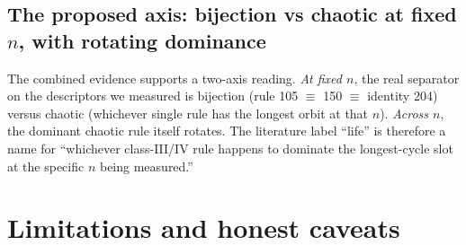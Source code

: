 \documentclass[11pt,a4paper]{article}
\begin{document}
\subsection{The proposed axis: bijection vs chaotic at fixed $n$, with rotating dominance}
The combined evidence supports a two-axis reading.
\emph{At fixed $n$}, the real separator on the descriptors we measured
is bijection (rule 105 $\equiv$ 150 $\equiv$ identity 204) versus
chaotic (whichever single rule has the longest orbit at that $n$).
\emph{Across $n$}, the dominant chaotic rule itself rotates.
The literature label
``life'' is therefore a name for ``whichever class-III/IV rule happens
to dominate the longest-cycle slot at the specific $n$ being measured.''

\section{Limitations and honest caveats}
\label{sec:limits}
\end{document}
